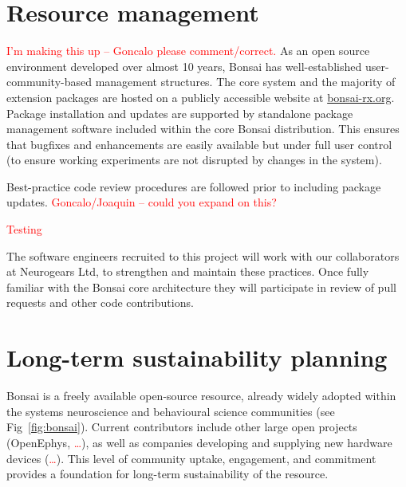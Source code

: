 \section{Resource management}
\textcolor{red}{I'm making this up -- Goncalo please comment/correct.}
%
As an open source environment developed over almost 10 years, Bonsai 
has well-established user-community-based management structures.
%
The core system and the majority of extension packages are hosted on a
publicly accessible website at \url{bonsai-rx.org}.
%
Package installation and updates are supported by standalone package
management software included within the core Bonsai distribution.
%
This ensures that bugfixes and enhancements are easily available but
under full user control (to ensure working experiments are not
disrupted by changes in the system).

Best-practice code review procedures are followed prior to including
package updates.  \textcolor{red}{Goncalo/Joaquin -- could you expand
  on this?}

\textcolor{red}{Testing}

The software engineers recruited to this project will work with our
collaborators at Neurogears Ltd, to strengthen and maintain these
practices.  Once fully familiar with the Bonsai core architecture they
will participate in review of pull requests and other code
contributions.  



\section{Long-term sustainability planning}

Bonsai is a freely available open-source resource, already widely adopted within the systems neuroscience and behavioural science communities (see Fig~\ref{fig:bonsai}).  
%
Current contributors include other large open projects (OpenEphys, \textcolor{red}{\dots}), as well as companies developing and supplying new hardware devices  (\textcolor{red}{\dots}).
%
This level of community uptake, engagement, and commitment provides a foundation for long-term sustainability of the resource.

